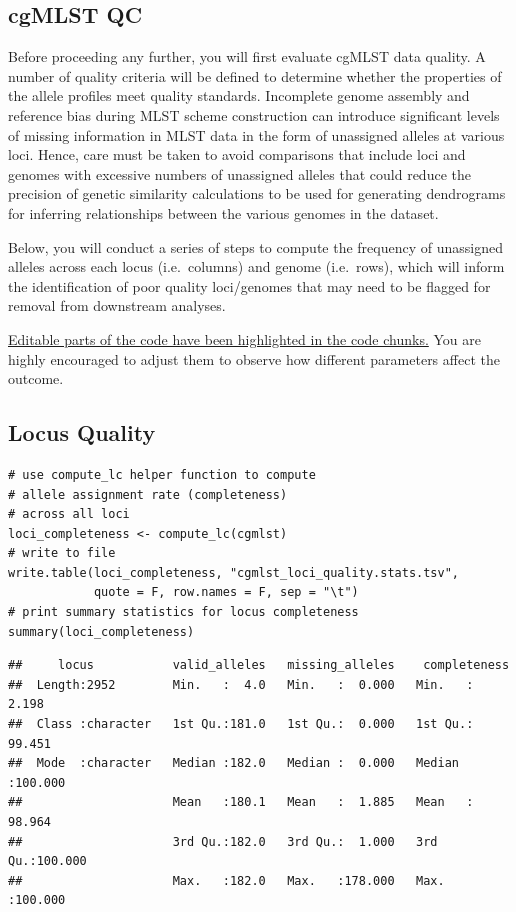 \documentclass[
]{book}
\begin{document}
\subsection{cgMLST QC}\label{cgmlst-qc}

Before proceeding any further, you will first evaluate cgMLST data quality. A number of quality criteria will be defined to determine whether the properties of the allele profiles meet quality standards. Incomplete genome assembly and reference bias during MLST scheme construction can introduce significant levels of missing information in MLST data in the form of unassigned alleles at various loci. Hence, care must be taken to avoid comparisons that include loci and genomes with excessive numbers of unassigned alleles that could reduce the precision of genetic similarity calculations to be used for generating dendrograms for inferring relationships between the various genomes in the dataset.

Below, you will conduct a series of steps to compute the frequency of unassigned alleles across each locus (i.e.~columns) and genome (i.e.~rows), which will inform the identification of poor quality loci/genomes that may need to be flagged for removal from downstream analyses.

\ul{Editable parts of the code have been highlighted in the code chunks.} You are highly encouraged to adjust them to observe how different parameters affect the outcome.

\subsection{Locus Quality}\label{locus-quality}

\begin{verbatim}
# use compute_lc helper function to compute 
# allele assignment rate (completeness) 
# across all loci
loci_completeness <- compute_lc(cgmlst)
# write to file
write.table(loci_completeness, "cgmlst_loci_quality.stats.tsv",
            quote = F, row.names = F, sep = "\t")
# print summary statistics for locus completeness
summary(loci_completeness)
\end{verbatim}

\begin{verbatim}
##     locus           valid_alleles   missing_alleles    completeness    
##  Length:2952        Min.   :  4.0   Min.   :  0.000   Min.   :  2.198  
##  Class :character   1st Qu.:181.0   1st Qu.:  0.000   1st Qu.: 99.451  
##  Mode  :character   Median :182.0   Median :  0.000   Median :100.000  
##                     Mean   :180.1   Mean   :  1.885   Mean   : 98.964  
##                     3rd Qu.:182.0   3rd Qu.:  1.000   3rd Qu.:100.000  
##                     Max.   :182.0   Max.   :178.000   Max.   :100.000
\end{verbatim}
\end{document}
